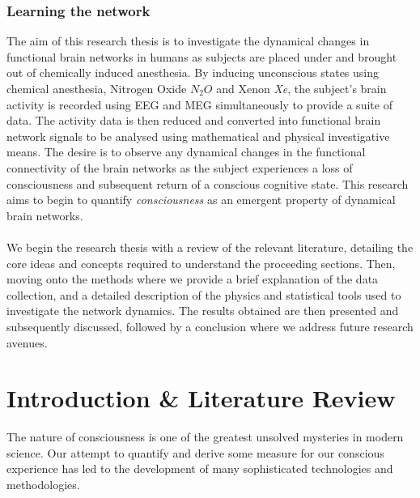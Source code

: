\documentclass{article}
\begin{document}
\subsubsection{Learning the network}



The aim of this research thesis is to investigate the dynamical changes in functional brain networks in humans as subjects are placed under and brought out of chemically induced anesthesia. By inducing unconscious states using chemical anesthesia, Nitrogen Oxide $N_2O$ and Xenon \emph{Xe}, the subject's brain activity is recorded using EEG and MEG simultaneously to provide a suite of data. The activity data is then reduced and converted into functional brain network signals to be analysed using mathematical and physical investigative means. The desire is to observe any dynamical changes in the functional connectivity of the brain networks as the subject experiences a loss of consciousness and subsequent return of a conscious cognitive state. This research aims to begin to quantify \emph{consciousness} as an emergent property of dynamical brain networks.
\\
\\
We begin the research thesis with a review of the relevant literature, detailing the core ideas and concepts required to understand the proceeding sections. Then, moving onto the methods where we provide a brief explanation of the data collection, and a detailed description of the physics and statistical tools used to investigate the network dynamics. The results obtained are then presented and subsequently discussed, followed by a conclusion where we address future research avenues.

\section{Introduction \& Literature Review}
The nature of consciousness is one of the greatest unsolved mysteries in modern science. Our attempt to quantify and derive some measure for our conscious experience has led to the development of many sophisticated technologies and methodologies. 
\end{document}
